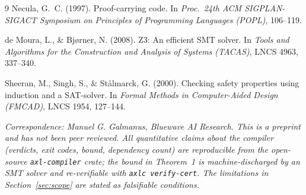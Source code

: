 \documentclass[11pt]{article}
\theoremstyle{plain}
\theoremstyle{definition}
\theoremstyle{remark}
\begin{document}
\begin{thebibliography}{9}
\small
{}
Necula, G.~C. (1997). Proof-carrying code. In
\emph{Proc.\ 24th ACM SIGPLAN-SIGACT Symposium on Principles of Programming
Languages (POPL)}, 106--119.

de Moura, L., \& Bj\o rner, N. (2008). Z3: An efficient SMT solver. In
\emph{Tools and Algorithms for the Construction and Analysis of Systems
(TACAS)}, LNCS 4963, 337--340.

Sheeran, M., Singh, S., \& St\aa lmarck, G. (2000). Checking safety properties
using induction and a SAT-solver. In \emph{Formal Methods in Computer-Aided
Design (FMCAD)}, LNCS 1954, 127--144.
\end{thebibliography}

\vspace{1em}
\noindent\emph{Correspondence: Manuel G. Galmanus, Bluewave AI Research. This
is a preprint and has not been peer reviewed. All quantitative claims about the
compiler (verdicts, exit codes, bound, dependency count) are reproducible from
the open-source \texttt{axl-compiler} crate; the bound in Theorem~1 is
machine-discharged by an SMT solver and re-verifiable with \texttt{axlc
verify-cert}. The limitations in Section~\ref{sec:scope} are stated as
falsifiable conditions.}
\end{document}
